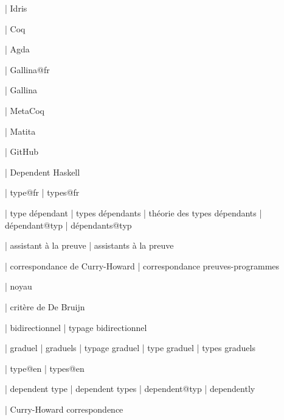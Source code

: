 





  | Idris

  | Coq

  | Agda

  | Gallina@fr

  | Gallina

  | MetaCoq

  | Matita

  | GitHub

  | Dependent Haskell


  | type@fr
  | types@fr

  | type dépendant
  | types dépendants
  | théorie des types dépendants
  | dépendant@typ
  | dépendants@typ

  | assistant à la preuve
  | assistants à la preuve

  | correspondance de Curry-Howard
  | correspondance preuves-programmes

  | noyau

  | critère de De Bruijn

  | bidirectionnel
  | typage bidirectionnel

  | graduel
  | graduels
  | typage graduel
  | type graduel
  | types graduels


  | type@en
  | types@en

  | dependent type
  | dependent types
  | dependent@typ
  | dependently

  | Curry-Howard correspondence

